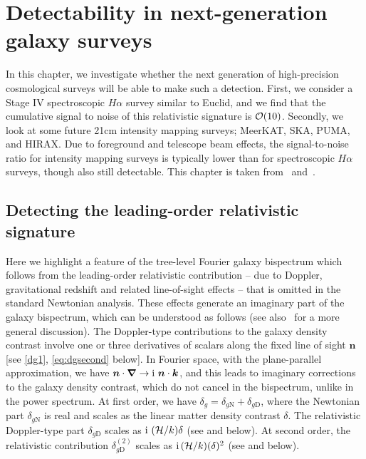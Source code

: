 
\chapter{Detectability in next-generation galaxy surveys}
\label{chapter:detect}


In this chapter, we investigate whether the next generation of high-precision cosmological surveys will be able to make such a detection. First, we consider a Stage IV spectroscopic $H\alpha$ survey similar to Euclid, and we find that the cumulative signal to noise of this relativistic signature  is $\mathcal{O}(10)$. Secondly, we look at some future 21cm intensity mapping surveys; MeerKAT, SKA, PUMA, and HIRAX. Due to foreground and telescope beam effects, the signal-to-noise ratio for intensity mapping surveys is typically lower than for spectroscopic $H\alpha$ surveys, though also still detectable. This chapter is taken from~\cite{Jolicoeur:2020eup} and~\cite{Maartens:2019yhx}.

\section{Detecting the leading-order relativistic signature}


Here we highlight a feature of the tree-level Fourier galaxy bispectrum which follows from the  leading-order relativistic contribution -- due to Doppler, gravitational redshift  and related line-of-sight effects -- that is omitted in the standard Newtonian analysis. These effects generate an imaginary part of the galaxy bispectrum, which can be understood as follows (see also~\cite{McDonald:2009dh,Clarkson:2018dwn,Jeong:2019igb} for a more general discussion).  
The Doppler-type contributions to the galaxy density contrast involve one or three derivatives  of scalars along the fixed line of sight $\bm n$ [see \eqref{dg1}, \eqref{eq:dgsecond} below]. In Fourier space, with the plane-parallel approximation, we have  $\bm{n}\cdot\bm{\nabla} \to {\mathrm{i\,}}\, \bm{n}\cdot\bm{k}$, and this leads to imaginary corrections to the galaxy density contrast, which do not cancel in the bispectrum, unlike in the power spectrum. At first order, we have $\delta_g=\delta_{g\mathrm{N}}+ \delta_{g\mathrm{D}}$, where the Newtonian part $\delta_{g\mathrm{N}}$ is real and scales as the linear matter density contrast $\delta$. The 
relativistic Doppler-type part $\delta_{g\mathrm{D}}$ scales as ${\mathrm{i\,}}\,(\mathcal{H}/k) \delta$  (see \cite{McDonald:2009dh, Jeong:2011as, Abramo:2017xnp,Clarkson:2018dwn} and below). At second  order, the relativistic contribution $\delta_{g\mathrm{D}}^{(2)}$ scales as ${\mathrm{i\,}}(\mathcal{H}/k) (\delta)^2$ (see \cite{Clarkson:2018dwn} and below). 


